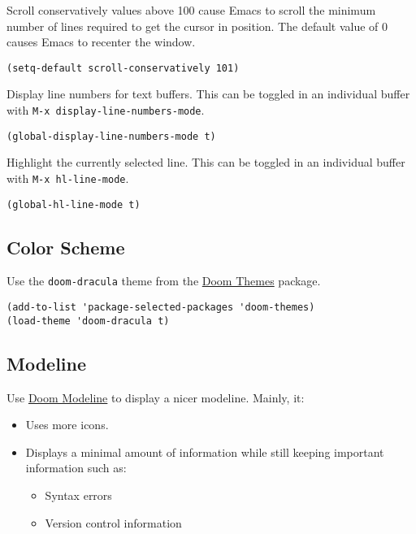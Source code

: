 \documentclass[11pt]{article}
\begin{document}
Scroll conservatively values above 100 cause Emacs to scroll the
minimum number of lines required to get the cursor in position. The
default value of 0 causes Emacs to recenter the window.

\begin{verbatim}
(setq-default scroll-conservatively 101)
\end{verbatim}

Display line numbers for text buffers. This can be toggled in an individual
buffer with \texttt{M-x display-line-numbers-mode}.

\begin{verbatim}
(global-display-line-numbers-mode t)
\end{verbatim}

Highlight the currently selected line. This can be toggled in an individual
buffer with \texttt{M-x hl-line-mode}.

\begin{verbatim}
(global-hl-line-mode t)
\end{verbatim}
\subsection{Color Scheme}
\label{sec:org27b1498}

Use the \texttt{doom-dracula} theme from the \href{https://github.com/doomemacs/themes/tree/729ad034631cba41602ad9191275ece472c21941}{Doom Themes} package.

\begin{verbatim}
(add-to-list 'package-selected-packages 'doom-themes)
(load-theme 'doom-dracula t)
\end{verbatim}
\subsection{Modeline}
\label{sec:orgea572eb}

Use \href{https://github.com/seagle0128/doom-modeline/tree/297b57585fe3b3de9e694512170c44c6e104808f}{Doom Modeline} to display a nicer modeline. Mainly, it:

\begin{itemize}
\item Uses more icons.
\item Displays a minimal amount of information while still keeping
important information such as:
\begin{itemize}
\item Syntax errors
\item Version control information
\end{itemize}
\end{itemize}
\end{document}
